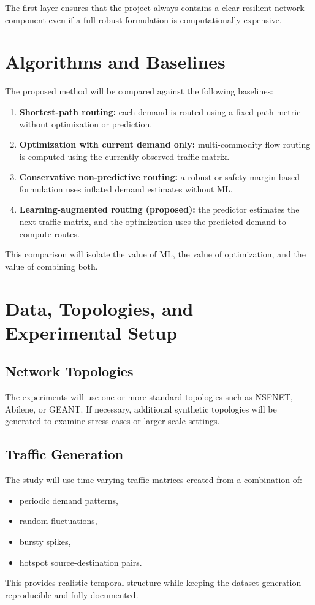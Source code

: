 \documentclass[11pt]{article}
\begin{document}
The first layer ensures that the project always contains a clear resilient-network component even if a full robust formulation is computationally expensive.

\section{Algorithms and Baselines}
The proposed method will be compared against the following baselines:
\begin{enumerate}
    \item \textbf{Shortest-path routing:} each demand is routed using a fixed path metric without optimization or prediction.
    \item \textbf{Optimization with current demand only:} multi-commodity flow routing is computed using the currently observed traffic matrix.
    \item \textbf{Conservative non-predictive routing:} a robust or safety-margin-based formulation uses inflated demand estimates without ML.
    \item \textbf{Learning-augmented routing (proposed):} the predictor estimates the next traffic matrix, and the optimization uses the predicted demand to compute routes.
\end{enumerate}

This comparison will isolate the value of ML, the value of optimization, and the value of combining both.

\section{Data, Topologies, and Experimental Setup}
\subsection{Network Topologies}
The experiments will use one or more standard topologies such as NSFNET, Abilene, or GEANT. If necessary, additional synthetic topologies will be generated to examine stress cases or larger-scale settings.

\subsection{Traffic Generation}
The study will use time-varying traffic matrices created from a combination of:
\begin{itemize}
    \item periodic demand patterns,
    \item random fluctuations,
    \item bursty spikes,
    \item hotspot source-destination pairs.
\end{itemize}
This provides realistic temporal structure while keeping the dataset generation reproducible and fully documented.
\end{document}
